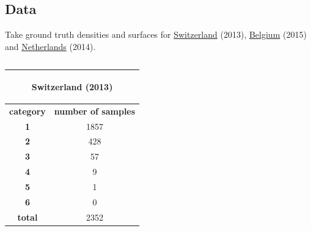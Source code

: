 \documentclass[c]{beamer}
\begin{document}
\subsection{Data}
\begin{frame}
\tableofcontents[currentsubsection]
\end{frame}

\begin{frame}
\begin{itemize}
{\scriptsize
 \item Take ground truth densities and surfaces for \href{https://www.bfs.admin.ch/bfs/fr/home/statistiques/population/effectif-evolution/population.assetdetail.1401563.html}{Switzerland} (2013),
  \href{https://fr.wikipedia.org/wiki/Liste_des_communes_de_Belgique_par_population}{Belgium} (2015)  and \href{https://www.citypopulation.de/php/netherlands-admin.php}{Netherlands} (2014).
 \begin{columns}
  \begin{column}{0.33\textwidth}
   \begin{table}
   \begin{center}
   \begin{adjustbox}{max width=0.5\textwidth}
    \begin{tabular}{|c|c|}
      \hline
      \multicolumn{2}{|c|}{\begin{bf}Switzerland (2013)\end{bf}} \\
      \hline
      \textbf{category} & \textbf{number of samples}\\
      \hline
      \textbf{1} & 1857\\
      \hline
      \textbf{2} & 428\\
      \hline
      \textbf{3} & 57\\
      \hline
      \textbf{4} & 9\\
      \hline
      \textbf{5} & 1\\
      \hline
      \textbf{6} & 0 \\
      \hline
      \textbf{total} & 2352\\
      \hline
    \end{tabular}
   \end{adjustbox}
   \end{center}
   \end{table}
  \end{column}
  \begin{column}{0.33\textwidth}
   \begin{table}
   \begin{center}

\end{center}
\end{table}
\end{column}
\end{columns}}
\end{itemize}
\end{frame}
\end{document}

